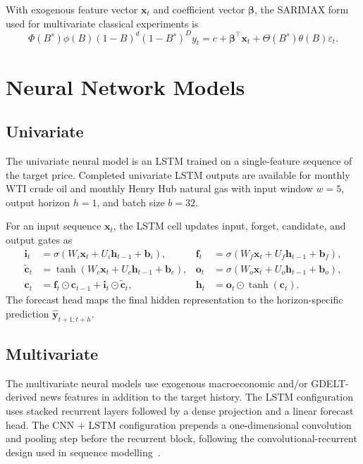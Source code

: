 \documentclass[11pt,a4paper]{article}
\begin{document}
With exogenous feature vector $\mathbf{x}_t$ and coefficient vector $\boldsymbol{\beta}$, the SARIMAX form used for multivariate classical experiments is
\begin{equation}
\Phi(B^s)\phi(B)(1-B)^d(1-B^s)^D y_t
= c + \boldsymbol{\beta}^{\top}\mathbf{x}_t + \Theta(B^s)\theta(B)\varepsilon_t.
\label{eq:sarimax}
\end{equation}

\section{Neural Network Models}\label{sec:neural}

\subsection{Univariate}

The univariate neural model is an LSTM trained on a single-feature sequence of the target price. Completed univariate LSTM outputs are available for monthly WTI crude oil and monthly Henry Hub natural gas with input window $w=5$, output horizon $h=1$, and batch size $b=32$.

For an input sequence $\mathbf{x}_t$, the LSTM cell updates input, forget, candidate, and output gates as
\begin{align}
\mathbf{i}_t &= \sigma(W_i\mathbf{x}_t+U_i\mathbf{h}_{t-1}+\mathbf{b}_i), &
\mathbf{f}_t &= \sigma(W_f\mathbf{x}_t+U_f\mathbf{h}_{t-1}+\mathbf{b}_f), \nonumber\\
\tilde{\mathbf{c}}_t &= \tanh(W_c\mathbf{x}_t+U_c\mathbf{h}_{t-1}+\mathbf{b}_c), &
\mathbf{o}_t &= \sigma(W_o\mathbf{x}_t+U_o\mathbf{h}_{t-1}+\mathbf{b}_o), \label{eq:lstm-gates}\\
\mathbf{c}_t &= \mathbf{f}_t\odot\mathbf{c}_{t-1}+\mathbf{i}_t\odot\tilde{\mathbf{c}}_t, &
\mathbf{h}_t &= \mathbf{o}_t\odot\tanh(\mathbf{c}_t). \nonumber
\end{align}
The forecast head maps the final hidden representation to the horizon-specific prediction $\hat{\mathbf{y}}_{t+1:t+h}$.

\subsection{Multivariate}

The multivariate neural models use exogenous macroeconomic and/or GDELT-derived news features in addition to the target history. The LSTM configuration uses stacked recurrent layers followed by a dense projection and a linear forecast head. The CNN + LSTM configuration prepends a one-dimensional convolution and pooling step before the recurrent block, following the convolutional-recurrent design used in sequence modelling~\citep{sainath2015convolutional, lecun1998gradient}.
\end{document}
